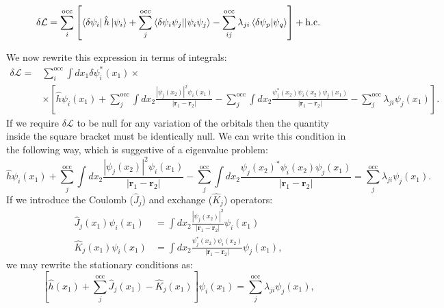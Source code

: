 \documentclass[../Main/chem532-notes.tex]{subfiles}
\begin{document}
\begin{equation}
\begin{split}
\delta \mathcal{L}  =
\sum_i^{\rm occ} \left[ \bra{\delta \psi_i} \hat{h} \ket{\psi_i} 
+ \sum_{j}^{\rm occ} \bra{\delta \psi_i \psi_j}\!\ket{\psi_i \psi_j} - \sum_{ij}^\mathrm{occ} \lambda_{ji} \braket{\delta\psi_p|\psi_q} \right] + \text{h.c.} 
\end{split}
\end{equation}

We now rewrite this expression in terms of integrals:
\begin{equation}
\begin{split}
\delta \mathcal{L}  =&
\sum_{i}^\mathrm{occ} \int dx_1 \delta\psi_{i}^{*}(x_1) \times \\
& \times
\left[
\hat{h}\psi_{i}(x_1) 
+ \sum_{j}^\mathrm{occ} \int dx_2 \frac{|\psi_{j}(x_2)|^2 \psi_{i}(x_1) }{|\mathbf{r}_1 - \mathbf{r}_2|}
- \sum_{j}^\mathrm{occ} \int dx_2 \frac{\psi_{j}^{*}(x_2) \psi_{i}(x_2) \psi_{j}(x_1) }{|\mathbf{r}_1 - \mathbf{r}_2|}
- \sum_{j}^\mathrm{occ} \lambda_{ji} \psi_{j}(x_1)
\right].
\end{split}
\end{equation}
If we require $\delta \mathcal{L}$ to be null for any variation of the orbitals then the quantity inside the square bracket must be identically null. We can write this condition in the following way, which is suggestive of a eigenvalue problem:
 \begin{equation}
\hat{h}\psi_{i}(x_1) 
+ \sum_{j}^\mathrm{occ} \int dx_2 \frac{|\psi_{j}(x_2)|^2 \psi_{i}(x_1) }{|\mathbf{r}_1 - \mathbf{r}_2|}
- \sum_{j}^\mathrm{occ} \int dx_2 \frac{\psi_{j}(x_2)^{*} \psi_{i}(x_2) \psi_{j}(x_1) }{|\mathbf{r}_1 - \mathbf{r}_2|}
= \sum_{j}^\mathrm{occ} \lambda_{ji} \psi_{j}(x_1).
\end{equation}
If we introduce the Coulomb ($\hat{J}_j$) and exchange ($\hat{K}_j$) operators:
\begin{align}
\hat{J}_j(x_1)\psi_{i}(x_1)  &= \int dx_2 \frac{|\psi_{j}(x_2)|^2}{|\mathbf{r}_1 - \mathbf{r}_2|} \psi_{i}(x_1) \\
\hat{K}_j(x_1)\psi_{i}(x_1)  &= \int dx_2 \frac{\psi_{j}^{*}(x_2) \psi_{i}(x_2)}{|\mathbf{r}_1 - \mathbf{r}_2|} \psi_{j}(x_1),
\end{align}
we may rewrite the stationary conditions as:
 \begin{equation}
\left[ \hat{h}(x_1) + \sum_{j}^\mathrm{occ} \hat{J}_j(x_1)- \hat{K}_j(x_1) \right] \psi_{i}(x_1) 
= \sum_{j}^\mathrm{occ} \lambda_{ji} \psi_{j}(x_1),
\end{equation}
\end{document}
